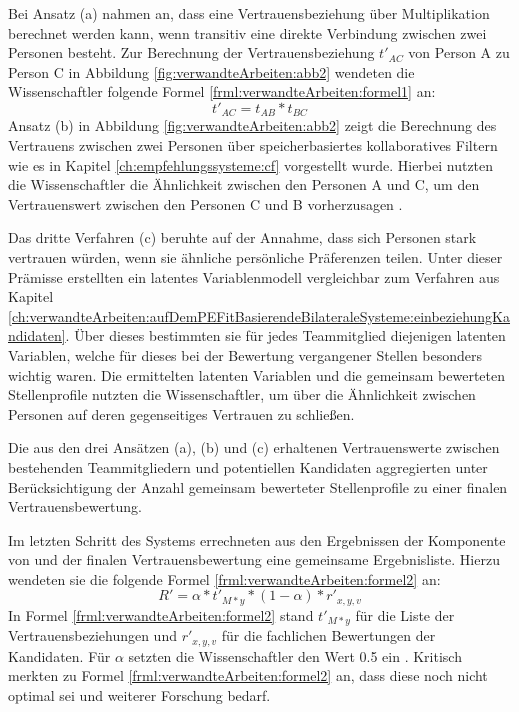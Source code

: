 Bei Ansatz (a) nahmen \textcite[S. 5f.]{malinowski:2005} an, dass eine Vertrauensbeziehung über Multiplikation berechnet werden kann, wenn transitiv eine direkte Verbindung zwischen zwei Personen besteht. Zur Berechnung der Vertrauensbeziehung $t'_{AC}$ von Person A zu Person C in Abbildung \ref{fig:verwandteArbeiten:abb2} wendeten die Wissenschaftler folgende Formel \ref{frml:verwandteArbeiten:formel1} an:
\begin{equation}
	t'_{AC} = t_{AB} * t_{BC}
	\label{frml:verwandteArbeiten:formel1}
\end{equation}
Ansatz (b) in Abbildung \ref{fig:verwandteArbeiten:abb2} zeigt die Berechnung des Vertrauens zwischen zwei Personen über speicherbasiertes kollaboratives Filtern wie es in Kapitel \ref{ch:empfehlungssysteme:cf} vorgestellt wurde. Hierbei nutzten die Wissenschaftler die Ähnlichkeit zwischen den Personen A und C, um den Vertrauenswert zwischen den Personen C und B vorherzusagen \cite[S. 6]{malinowski:2005}.

Das dritte Verfahren (c) beruhte auf der Annahme, dass sich Personen stark vertrauen würden, wenn sie ähnliche persönliche Präferenzen teilen. Unter dieser Prämisse erstellten \textcite[S. 6f.]{malinowski:2005} ein latentes Variablenmodell vergleichbar zum Verfahren aus Kapitel \ref{ch:verwandteArbeiten:aufDemPEFitBasierendeBilateraleSysteme:einbeziehungKandidaten}. Über dieses bestimmten sie für jedes Teammitglied diejenigen latenten Variablen, welche für dieses bei der Bewertung vergangener Stellen besonders wichtig waren. Die ermittelten latenten Variablen und die gemeinsam bewerteten Stellenprofile nutzten die Wissenschaftler, um über die Ähnlichkeit zwischen Personen auf deren gegenseitiges Vertrauen zu schließen.

Die aus den drei Ansätzen (a), (b) und (c) erhaltenen Vertrauenswerte zwischen bestehenden Teammitgliedern und potentiellen Kandidaten aggregierten \textcite[S. 7ff.]{malinowski:2005} unter Berücksichtigung der Anzahl gemeinsam bewerteter Stellenprofile zu einer finalen Vertrauensbewertung.

Im letzten Schritt des Systems errechneten \textcite[S. 9f.]{malinowski:2005} aus den Ergebnissen der Komponente von \textcite[S. 8ff.]{faerber:2003} und der finalen Vertrauensbewertung eine gemeinsame Ergebnisliste. Hierzu wendeten sie die folgende Formel \ref{frml:verwandteArbeiten:formel2} an:
\begin{equation}
	R' = \alpha * t'_{M*y} * (1-\alpha) * r'_{x,y,v}
	\label{frml:verwandteArbeiten:formel2}
\end{equation}
In Formel \ref{frml:verwandteArbeiten:formel2} stand $t'_{M*y}$ für die Liste der Vertrauensbeziehungen und $r'_{x,y,v}$ für die fachlichen Bewertungen der Kandidaten. Für $\alpha$ setzten die Wissenschaftler den Wert 0.5 ein \cite[S. 4ff.]{malinowski:2005}. Kritisch merkten \textcite[S. 9]{malinowski:2005} zu Formel \ref{frml:verwandteArbeiten:formel2} an, dass diese noch nicht optimal sei und weiterer Forschung bedarf.

